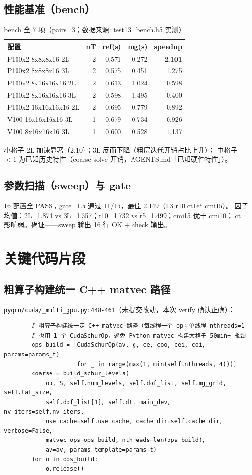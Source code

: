 \documentclass[UTF8]{ctexart}
\begin{document}
\subsection{性能基准（bench）}
\begin{table}[htbp]\centering
\begin{tabular}{lrrrr}
\toprule
配置 & nT & ref(s) & mg(s) & speedup \\
\midrule
P100x2 8x8x8x16 2L & 2 & 0.571 & 0.272 & \textbf{2.101} \\
P100x2 8x8x8x16 3L & 2 & 0.575 & 0.451 & 1.275 \\
P100x2 8x16x16x16 2L & 2 & 0.613 & 1.024 & 0.598 \\
P100x2 8x16x16x16 3L & 2 & 0.598 & 1.495 & 0.400 \\
P100x2 16x16x16x16 2L & 2 & 0.695 & 0.779 & 0.892 \\
V100 16x16x16x16 3L & 1 & 0.679 & 0.734 & 0.926 \\
V100 8x16x16x16 3L & 1 & 0.600 & 0.528 & 1.137 \\
\bottomrule
\end{tabular}
\caption{bench 全 7 项（pairs=3；数据来源: test13\_bench.h5 实测）}
\end{table}

小格子 2L 加速显著（2.10）；3L 反而下降（粗层迭代开销占比上升）；
中格子 $<1$ 为已知历史特性（coarse solve 开销，AGENTS.md「已知硬件特性」）。

\subsection{参数扫描（sweep）与 gate}
16 配置全 PASS；gate=1.5 通过 11/16，最佳 2.149（L3 r10 ct1e5 cmi15）。
因子均值：2L=1.874 vs 3L=1.357；r10=1.732 vs r5=1.499；cmi15 优于 cmi10；
ct 影响弱。\textcolor{struct}{确证}——sweep 输出 16 行 OK + check 输出。

\section{关键代码片段}
\subsection{粗算子构建统一 C++ matvec 路径}
\texttt{pyqcu/cuda/\_multi\_gpu.py:448-461}（未提交改动，本次 verify 确认正确）：
\begin{lstlisting}
        # 粗算子构建统一走 C++ matvec 路径（每线程一个 op；单线程 nthreads=1
        # 也用 1 个 CudaSchurOp，避免 Python matvec 构建大格子 50min+ 瓶颈
        ops_build = [CudaSchurOp(av, g, ce, coo, cei, coi, params=params_t)
                     for _ in range(max(1, min(self.nthreads, 4)))]
        coarse = build_schur_levels(
            op, S, self.num_levels, self.dof_list, self.mg_grid, self.lat_size,
            self.dof_list[1], self.dt, main_dev, nv_iters=self.nv_iters,
            use_cache=self.use_cache, cache_dir=self.cache_dir, verbose=False,
            matvec_ops=ops_build, nthreads=len(ops_build),
            av=av, params_template=params_t)
        for o in ops_build:
            o.release()
\end{lstlisting}
\end{document}
